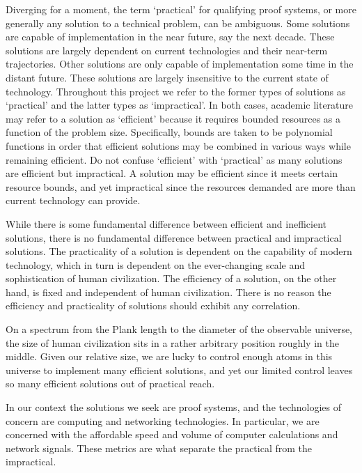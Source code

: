Diverging for a moment, the term `practical' for qualifying proof systems, or more generally any solution to a technical problem, can be ambiguous.
Some solutions are capable of implementation in the near future, say the next decade.
These solutions are largely dependent on current technologies and their near-term trajectories.
Other solutions are only capable of implementation some time in the distant future.
These solutions are largely insensitive to the current state of technology.
Throughout this project we refer to the former types of solutions as `practical' and the latter types as `impractical'.
In both cases, academic literature may refer to a solution as `efficient' because it requires bounded resources as a function of the problem size.
Specifically, bounds are taken to be polynomial functions in order that efficient solutions may be combined in various ways while remaining efficient.
Do not confuse `efficient' with `practical' as many solutions are efficient but impractical.
A solution may be efficient since it meets certain resource bounds, and yet impractical since the resources demanded are more than current technology can provide.

\begin{remark}
    While there is some fundamental difference between efficient and inefficient solutions, there is no fundamental difference between practical and impractical solutions.
    The practicality of a solution is dependent on the capability of modern technology, which in turn is dependent on the ever-changing scale and sophistication of human civilization.
    The efficiency of a solution, on the other hand, is fixed and independent of human civilization. 
    There is no reason the efficiency and practicality of solutions should exhibit any correlation.

    On a spectrum from the Plank length to the diameter of the observable universe, the size of human civilization sits in a rather arbitrary position roughly in the middle.
    Given our relative size, we are lucky to control enough atoms in this universe to implement many efficient solutions, and yet our limited control leaves so many efficient solutions out of practical reach.
\end{remark}

In our context the solutions we seek are proof systems, and the technologies of concern are computing and networking technologies.
In particular, we are concerned with the affordable speed and volume of computer calculations and network signals.
These metrics are what separate the practical from the impractical.

